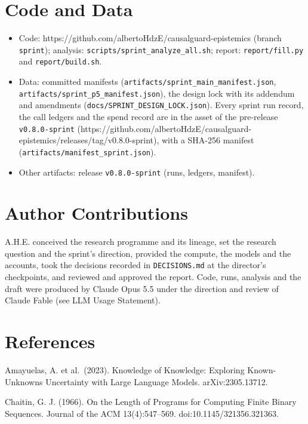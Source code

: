 \documentclass[
  10pt,
]{article}
\providecommand{\tightlist}{%
  \setlength{\itemsep}{0pt}\setlength{\parskip}{0pt}}
\begin{document}
\section{Code and Data}\label{code-and-data}

\begin{itemize}
\tightlist
\item
  Code: https://github.com/albertoHdzE/causalguard-epistemics (branch
  \texttt{sprint}); analysis: \texttt{scripts/sprint\_analyze\_all.sh};
  report: \texttt{report/fill.py} and \texttt{report/build.sh}.
\item
  Data: committed manifests
  (\texttt{artifacts/sprint\_main\_manifest.json},
  \texttt{artifacts/sprint\_p5\_manifest.json}), the design lock with
  its addendum and amendments (\texttt{docs/SPRINT\_DESIGN\_LOCK.json}).
  Every sprint run record, the call ledgers and the spend record are in
  the asset of the pre-release \texttt{v0.8.0-sprint}
  (https://github.com/albertoHdzE/causalguard-epistemics/releases/tag/v0.8.0-sprint),
  with a SHA-256 manifest (\texttt{artifacts/manifest\_sprint.json}).
\item
  Other artifacts: release \texttt{v0.8.0-sprint} (runs, ledgers,
  manifest).
\end{itemize}

\section{Author Contributions}\label{author-contributions}

A.H.E. conceived the research programme and its lineage, set the
research question and the sprint's direction, provided the compute, the
models and the accounts, took the decisions recorded in
\texttt{DECISIONS.md} at the director's checkpoints, and reviewed and
approved the report. Code, runs, analysis and the draft were produced by
Claude Opus 5.5 under the direction and review of Claude Fable (see LLM
Usage Statement).

\section{References}\label{references}

Amayuelas, A. et al.~(2023). Knowledge of Knowledge: Exploring
Known-Unknowns Uncertainty with Large Language Models. arXiv:2305.13712.

Chaitin, G. J. (1966). On the Length of Programs for Computing Finite
Binary Sequences. Journal of the ACM 13(4):547--569.
doi:10.1145/321356.321363.
\end{document}
